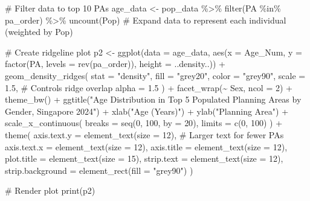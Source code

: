 \documentclass[
  letterpaper,
  DIV=11,
  numbers=noendperiod]{scrartcl}
\newenvironment{Shaded}{\begin{snugshade}}{\end{snugshade}}
\newcommand{\AttributeTok}[1]{\textcolor[rgb]{0.40,0.45,0.13}{#1}}
\newcommand{\CommentTok}[1]{\textcolor[rgb]{0.37,0.37,0.37}{#1}}
\newcommand{\DecValTok}[1]{\textcolor[rgb]{0.68,0.00,0.00}{#1}}
\newcommand{\FloatTok}[1]{\textcolor[rgb]{0.68,0.00,0.00}{#1}}
\newcommand{\FunctionTok}[1]{\textcolor[rgb]{0.28,0.35,0.67}{#1}}
\newcommand{\NormalTok}[1]{\textcolor[rgb]{0.00,0.23,0.31}{#1}}
\newcommand{\OtherTok}[1]{\textcolor[rgb]{0.00,0.23,0.31}{#1}}
\newcommand{\SpecialCharTok}[1]{\textcolor[rgb]{0.37,0.37,0.37}{#1}}
\newcommand{\StringTok}[1]{\textcolor[rgb]{0.13,0.47,0.30}{#1}}
\begin{document}
\begin{Shaded}
\begin{Highlighting}[]
\CommentTok{\# Filter data to top 10 PAs}
\NormalTok{age\_data }\OtherTok{\textless{}{-}}\NormalTok{ pop\_data }\SpecialCharTok{\%\textgreater{}\%}
  \FunctionTok{filter}\NormalTok{(PA }\SpecialCharTok{\%in\%}\NormalTok{ pa\_order) }\SpecialCharTok{\%\textgreater{}\%}
  \FunctionTok{uncount}\NormalTok{(Pop)  }\CommentTok{\# Expand data to represent each individual (weighted by Pop)}

\CommentTok{\# Create ridgeline plot}
\NormalTok{p2 }\OtherTok{\textless{}{-}} \FunctionTok{ggplot}\NormalTok{(}\AttributeTok{data =}\NormalTok{ age\_data, }\FunctionTok{aes}\NormalTok{(}\AttributeTok{x =}\NormalTok{ Age\_Num, }\AttributeTok{y =} \FunctionTok{factor}\NormalTok{(PA, }\AttributeTok{levels =} \FunctionTok{rev}\NormalTok{(pa\_order)), }\AttributeTok{height =}\NormalTok{ ..density..)) }\SpecialCharTok{+}
  \FunctionTok{geom\_density\_ridges}\NormalTok{(}
    \AttributeTok{stat =} \StringTok{"density"}\NormalTok{,}
    \AttributeTok{fill =} \StringTok{"grey20"}\NormalTok{,}
    \AttributeTok{color =} \StringTok{"grey90"}\NormalTok{,}
    \AttributeTok{scale =} \FloatTok{1.5}\NormalTok{,  }\CommentTok{\# Controls ridge overlap}
    \AttributeTok{alpha =} \FloatTok{1.5}
\NormalTok{  ) }\SpecialCharTok{+}
  \FunctionTok{facet\_wrap}\NormalTok{(}\SpecialCharTok{\textasciitilde{}}\NormalTok{ Sex, }\AttributeTok{ncol =} \DecValTok{2}\NormalTok{) }\SpecialCharTok{+}
  \FunctionTok{theme\_bw}\NormalTok{() }\SpecialCharTok{+}
  \FunctionTok{ggtitle}\NormalTok{(}\StringTok{"Age Distribution in Top 5 Populated Planning Areas by Gender, Singapore 2024"}\NormalTok{) }\SpecialCharTok{+}
  \FunctionTok{xlab}\NormalTok{(}\StringTok{"Age (Years)"}\NormalTok{) }\SpecialCharTok{+}
  \FunctionTok{ylab}\NormalTok{(}\StringTok{"Planning Area"}\NormalTok{) }\SpecialCharTok{+}
  \FunctionTok{scale\_x\_continuous}\NormalTok{(}
    \AttributeTok{breaks =} \FunctionTok{seq}\NormalTok{(}\DecValTok{0}\NormalTok{, }\DecValTok{100}\NormalTok{, }\AttributeTok{by =} \DecValTok{20}\NormalTok{),}
    \AttributeTok{limits =} \FunctionTok{c}\NormalTok{(}\DecValTok{0}\NormalTok{, }\DecValTok{100}\NormalTok{)}
\NormalTok{  ) }\SpecialCharTok{+}
  \FunctionTok{theme}\NormalTok{(}
    \AttributeTok{axis.text.y =} \FunctionTok{element\_text}\NormalTok{(}\AttributeTok{size =} \DecValTok{12}\NormalTok{),  }\CommentTok{\# Larger text for fewer PAs}
    \AttributeTok{axis.text.x =} \FunctionTok{element\_text}\NormalTok{(}\AttributeTok{size =} \DecValTok{12}\NormalTok{),}
    \AttributeTok{axis.title =} \FunctionTok{element\_text}\NormalTok{(}\AttributeTok{size =} \DecValTok{12}\NormalTok{),}
    \AttributeTok{plot.title =} \FunctionTok{element\_text}\NormalTok{(}\AttributeTok{size =} \DecValTok{15}\NormalTok{),}
    \AttributeTok{strip.text =} \FunctionTok{element\_text}\NormalTok{(}\AttributeTok{size =} \DecValTok{12}\NormalTok{),}
    \AttributeTok{strip.background =} \FunctionTok{element\_rect}\NormalTok{(}\AttributeTok{fill =} \StringTok{"grey90"}\NormalTok{)}
\NormalTok{  )}

\CommentTok{\# Render plot}
\FunctionTok{print}\NormalTok{(p2)}
\end{Highlighting}
\end{Shaded}
\end{document}
